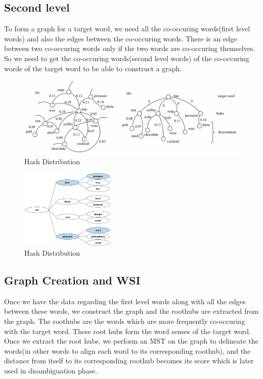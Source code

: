 \documentclass[article,dr=phil,type=drfinal,colorback,accentcolor=tud9c]{tudthesis}
\begin{document}
\newpage
\subsection{Second level}
To form a graph for a target word, we need all the co-occuring words(first level words) and also the edges between the co-occuring words. There is an edge between two co-occuring words only if the two words are co-occuring themselves. So we need to get the co-occuring words(second level words) of the co-occuring words of the target word to be able to construct a graph.

\begin{figure}[htb]
	\centering
	\includegraphics[width=150mm]{images/mst}
	\caption[Hash Distribution]{Hash Distribution}
	\label{fig:mst}
\end{figure}

\begin{figure}[h]
	\centering
	\includegraphics[width=0.4\textwidth]{images/secondlevel}
	\caption[Hash Distribution]{Hash Distribution}
	\label{fig:secondlevel}
\end{figure}



\newpage
\subsection{Graph Creation and WSI}
Once we have the data regarding the first level words along with all the edges between these words, we construct the graph and the roothubs are extracted from the graph. The roothubs are the words which are more frequently co-occuring with the target word. These root hubs form the word senses of the target word. Once we extract the root hubs, we perform an MST on the graph to delineate the words(in other words to align each word to its corresponding roothub), and the distance from itself to its corresponding roothub becomes its score which is later used in disambiguation phase.
\end{document}
